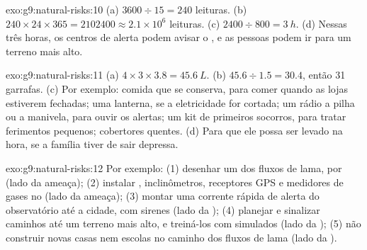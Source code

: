 \begin{solution}{exo:g9:natural-risks:10}
(a) $3600 \div 15 = 240$ leituras. (b) $240 \times 24 \times 365 =
\num{2102400} \approx 2.1 \times 10^6$ leituras. (c) $2400 \div 800 =
\qty{3}{h}$. (d) Nessas três horas, os centros de alerta podem avisar o
, e as pessoas podem ir para um terreno mais alto.
\end{solution}

\begin{solution}{exo:g9:natural-risks:11}
(a) $4 \times 3 \times 3.8 = \qty{45.6}{L}$. (b) $45.6 \div 1.5 = 30.4$,
então 31 garrafas. (c) Por exemplo: comida que se conserva, para comer
quando as lojas estiverem fechadas; uma lanterna, se a eletricidade for
cortada; um rádio a pilha ou a manivela, para ouvir os alertas; um kit de
primeiros socorros, para tratar ferimentos pequenos; cobertores quentes.
(d) Para que ele possa ser levado na hora, se a família tiver de sair
depressa.
\end{solution}

\begin{solution}{exo:g9:natural-risks:12}
Por exemplo: (1) desenhar um  dos fluxos de lama,  por
 (lado da ameaça); (2) instalar , inclinômetros,
receptores GPS e medidores de gases no  (lado da ameaça); (3)
montar uma corrente rápida de alerta do observatório até a cidade, com
sirenes (lado da ); (4) planejar e sinalizar caminhos até
um terreno mais alto, e treiná-los com simulados (lado da
); (5) não construir novas casas nem escolas no caminho
dos fluxos de lama (lado da ).
\end{solution}

